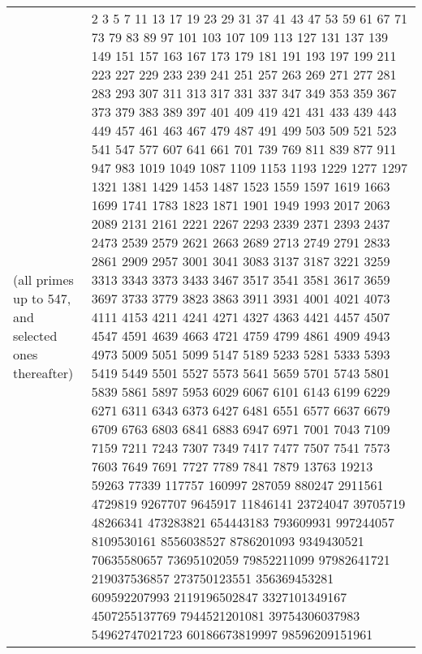 \documentclass[letterpaper]{article}
\begin{document}
\begin{tabular}{@{}p{4cm}p{14cm}@{}}
(all primes up to 547, and selected ones thereafter)&2 3 5 7 11 13 17 19 23 29 31 37 41 43 47 53 59 61 67 71 73 79 83 89 97 101 103 107 109 113 127 131 137 139 149 151 157 163 167 173 179 181 191 193 197 199 211 223 227 229 233 239 241 251 257 263 269 271 277 281 283 293 307 311 313 317 331 337 347 349 353 359 367 373 379 383 389 397 401 409 419 421 431 433 439 443 449 457 461 463 467 479 487 491 499 503 509 521 523 541 547 577 607 641 661 701 739 769 811 839 877 911 947 983 1019 1049 1087 1109 1153 1193 1229 1277 1297 1321 1381 1429 1453 1487 1523 1559 1597 1619 1663 1699 1741 1783 1823 1871 1901 1949 1993 2017 2063 2089 2131 2161 2221 2267 2293 2339 2371 2393 2437 2473 2539 2579 2621 2663 2689 2713 2749 2791 2833 2861 2909 2957 3001 3041 3083 3137 3187 3221 3259 3313 3343 3373 3433 3467 3517 3541 3581 3617 3659 3697 3733 3779 3823 3863 3911 3931 4001 4021 4073 4111 4153 4211 4241 4271 4327 4363 4421 4457 4507 4547 4591 4639 4663 4721 4759 4799 4861 4909 4943 4973 5009 5051 5099 5147 5189 5233 5281 5333 5393 5419 5449 5501 5527 5573 5641 5659 5701 5743 5801 5839 5861 5897 5953 6029 6067 6101 6143 6199 6229 6271 6311 6343 6373 6427 6481 6551 6577 6637 6679 6709 6763 6803 6841 6883 6947 6971 7001 7043 7109 7159 7211 7243 7307 7349 7417 7477 7507 7541 7573 7603 7649 7691 7727 7789 7841 7879 13763 19213 59263 77339 117757 160997 287059 880247 2911561 4729819 9267707 9645917 11846141 23724047 39705719 48266341 473283821 654443183 793609931 997244057 8109530161 8556038527 8786201093 9349430521 70635580657 73695102059 79852211099 97982641721 219037536857 273750123551 356369453281 609592207993 2119196502847 3327101349167 4507255137769 7944521201081 39754306037983 54962747021723 60186673819997 98596209151961
\end{tabular}
\end{document}
